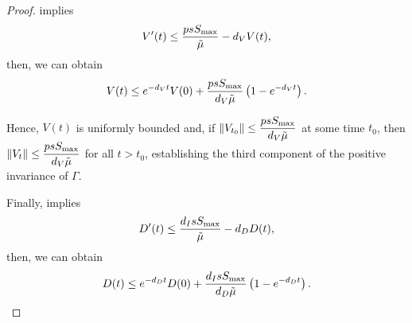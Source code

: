 \documentclass{CMHPhD-SIVD}
\begin{document}
\begin{proof}


 implies
\begin{eqnarray}\label{39}
V'(t)\leq \frac{ps S_{\text{max}}}{\tilde{\mu}}-d_V V(t),
\end{eqnarray}
then, we can obtain
\begin{align*}
V(t)\leq e^{-d_V t}V(0)+\frac{p s S_{\text{max}}}{d_V\tilde{\mu}}\left(1-e^{-d_V t}\right).
\end{align*}

Hence, $V(t)$ is uniformly bounded and, if $\|V_{t_0}\| \leq \dfrac{ p s S_{\text{max}}}{d_V\tilde{\mu}}$ at some time ${t_0}$,  then $\|V_t\| \leq \dfrac{ p s S_{\text{max}}}{d_V\tilde{\mu}}$ for all $t>t_0$, establishing the third component of the positive invariance of $\Gamma$.



Finally,  implies
\begin{eqnarray}\label{40}
D'(t)\leq  \dfrac{d_I s S_{\text{max}}}{\tilde{\mu}}-d_D D(t),
\end{eqnarray}
then, we can obtain
\begin{align*}
D(t)\leq e^{-d_D t}D(0)+\dfrac{d_I s S_{\text{max}}}{d_D\tilde{\mu}}\left(1-e^{-d_D t}\right).
\end{align*}


\end{proof}
\end{document}
